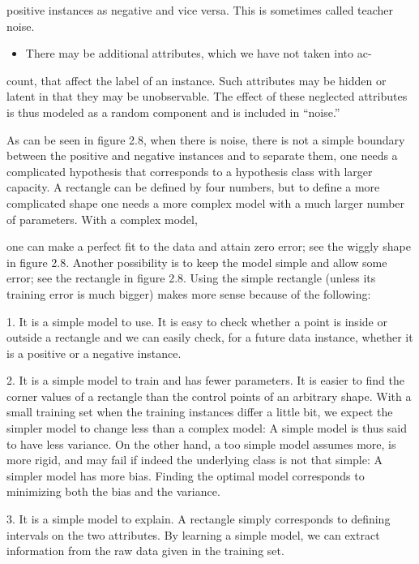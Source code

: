 positive instances as negative and vice versa. This is sometimes called teacher noise.

\begin{itemize}
\item There may be additional attributes, which we have not taken into ac-
\end{itemize}

count, that affect the label of an instance. Such attributes may be hidden or latent in that they may be unobservable. The effect of these neglected attributes is thus modeled as a random component and is included in “noise.”

As can be seen in figure 2.8, when there is noise, there is not a simple boundary between the positive and negative instances and to separate them, one needs a complicated hypothesis that corresponds to a hypothesis class with larger capacity. A rectangle can be defined by four numbers, but to define a more complicated shape one needs a more complex model with a much larger number of parameters. With a complex model,

one can make a perfect fit to the data and attain zero error; see the wiggly shape in figure 2.8. Another possibility is to keep the model simple and allow some error; see the rectangle in figure 2.8. Using the simple rectangle (unless its training error is much bigger) makes more sense because of the following:

1. It is a simple model to use. It is easy to check whether a point is inside or outside a rectangle and we can easily check, for a future data instance, whether it is a positive or a negative instance.

2. It is a simple model to train and has fewer parameters. It is easier to find the corner values of a rectangle than the control points of an arbitrary shape. With a small training set when the training instances differ a little bit, we expect the simpler model to change less than a complex model: A simple model is thus said to have less variance. On the other hand, a too simple model assumes more, is more rigid, and may fail if indeed the underlying class is not that simple: A simpler model has more bias. Finding the optimal model corresponds to minimizing both the bias and the variance.

3. It is a simple model to explain. A rectangle simply corresponds to defining intervals on the two attributes. By learning a simple model, we can extract information from the raw data given in the training set.

